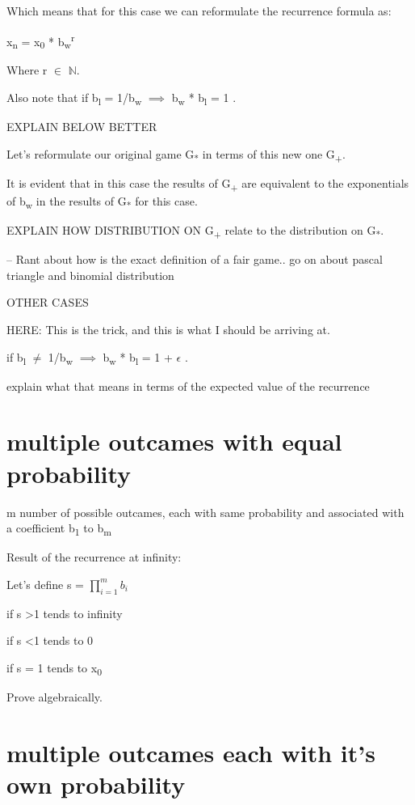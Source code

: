 \documentclass[12pt,reqno]{amsart}
\begin{document}
Which means that for this case we can reformulate the recurrence formula as:

x\textsubscript{n} = x\textsubscript{0} * b\textsubscript{w}\textsuperscript{r}

Where r $\in$ $\mathbb{N}$.  

Also note that if b\textsubscript{l} = 1/b\textsubscript{w} $\implies$ b\textsubscript{w} * b\textsubscript{l} = 1 .

EXPLAIN BELOW BETTER

Let's reformulate our original game G\textsubscript{*} in terms of this new one G\textsubscript{+}.

It is evident that in this case the results of G\textsubscript{+} are equivalent to the exponentials of b\textsubscript{w} in the results of G\textsubscript{*} for this case.

EXPLAIN HOW DISTRIBUTION ON G\textsubscript{+} relate to the distribution on G\textsubscript{*}.

-- Rant about how is the exact definition of a fair game.. go on about pascal triangle and binomial distribution


OTHER CASES

HERE: This is the trick, and this is what I should be arriving at.

if b\textsubscript{l} $\neq$ 1/b\textsubscript{w}  $\implies$  b\textsubscript{w} * b\textsubscript{l} = 1 + $\epsilon$ .

explain what that means in terms of the expected value of the recurrence


\section{multiple outcames with equal probability}

m number of possible outcames, each with same probability and associated with a coefficient b\textsubscript{1} to b\textsubscript{m}



Result of the recurrence at infinity:



Let's define s = $\prod_{i=1}^{m} b_{i}$

if s \textgreater 1 tends to infinity

if s \textless 1 tends to 0

if s = 1 tends to x\textsubscript{0}


Prove algebraically.

\section{multiple outcames each with it's own probability}
\end{document}
